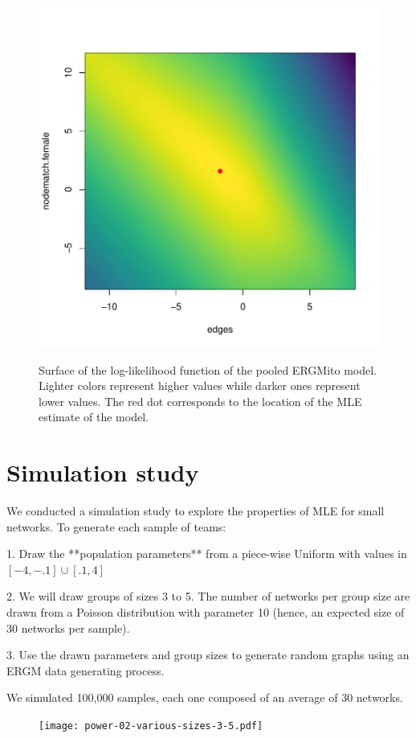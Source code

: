 \documentclass[12pt]{article}
\begin{document}
\begin{figure}
    \centering
    \caption{Surface of the log-likelihood function of the pooled ERGMito model. Lighter colors represent higher values while darker ones represent lower values. The red dot corresponds to the location of the MLE estimate of the model.}
    \includegraphics[width=.7\linewidth]{figures/fivenets_loglike.pdf}
    \label{fig:fivenets-loglike}
\end{figure}

\section{Simulation study}

We conducted a simulation study to explore the properties of MLE for small networks. To generate each sample of teams:

1. Draw the **population parameters** from a piece-wise Uniform with values in $[-4, -.1]\cup[.1, 4]$

2. We will draw groups of sizes 3 to 5. The number of networks per group size are drawn from a Poisson distribution with parameter 10 (hence, an expected size of 30 networks per sample).

3. Use the drawn parameters and group sizes to generate random graphs using an ERGM data generating process.

We simulated 100,000 samples, each one composed of an average of 30 networks.

\begin{figure}
	\centering
	\texttt{[image: power-02-various-sizes-3-5.pdf]}
\end{figure}
\end{document}

